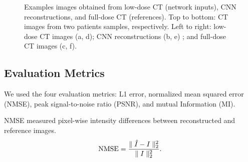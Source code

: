 \documentclass[conference]{IEEEtran}
\begin{document}
\begin{figure*}[!t]
\centering
{}
\hfil
{}
\hfil
{}
\hfil
{}
\hfil
{}
\hfil
{}
\caption{Examples images obtained from low-dose CT (network inputs), CNN reconstructions, and full-dose CT (references). Top to bottom: CT images from two patients samples, respectively. Left to right: low-dose CT images (a, d); CNN reconstructions (b, e) ; and full-dose CT images (c, f).}
\label{ct-image}
\end{figure*}



\subsection{Evaluation Metrics}

We used the four evaluation metrics: L1 error, normalized mean squared error (NMSE), peak signal-to-noise ratio (PSNR), and mutual Information (MI).

NMSE measured pixel-wise intensity differences between reconstructed and reference images.
\begin{equation}
\label{nmse}
{\rm NMSE}= \frac{\parallel \hat I - I \parallel _2^2}{\parallel I \parallel _2^2}.
\end{equation}
\end{document}
